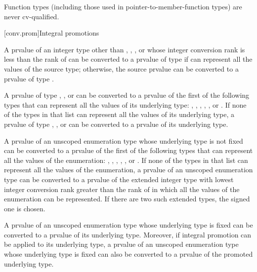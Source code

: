 \pnum
\begin{note}
Function types (including those used in pointer-to-member-function types)
are never cv-qualified.
\end{note}

[conv.prom]{Integral promotions}

\pnum
{}%
A prvalue of an integer type other than , ,
, or  whose integer conversion
rank is less than the rank of  can be
converted to a prvalue of type  if  can represent
all the values of the source type; otherwise, the source prvalue can be
converted to a prvalue of type .

\pnum
{}%
%
%
A prvalue of type , , or
 can be converted to a prvalue
of the first of the following types that can represent all the values of
its underlying type: , , ,
, ,
or . If none of the types in that list can
represent all the values of its underlying type, a prvalue of type
, , or  can be converted
to a prvalue of its underlying type.

\pnum
{}%
A prvalue of an unscoped enumeration type whose underlying type is not
fixed can be converted to a prvalue of the first of the following
types that can represent all the values of the enumeration: ,
, , ,
, or . If none of the types in that
list can represent all the values of the enumeration, a prvalue of an unscoped
enumeration type can be converted to a prvalue of the extended integer type with lowest
integer conversion rank greater than the rank of 
in which all the values of the enumeration can be represented. If there are
two such extended types, the signed one is chosen.

\pnum
A prvalue of an unscoped enumeration type whose underlying type is
fixed can be converted to a prvalue of its underlying type. Moreover,
if integral promotion can be applied to its underlying type, a prvalue of an unscoped
enumeration type whose underlying type is fixed can also be converted to a prvalue of
the promoted underlying type.


